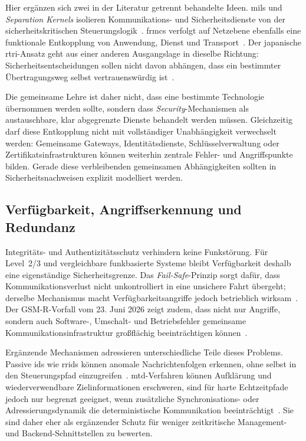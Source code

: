 \documentclass[runningheads]{res/llncs}
\begin{document}
Hier ergänzen sich zwei in der Literatur getrennt behandelte Ideen. \gls{mils} und \textit{Separation Kernels} isolieren Kommunikations- und Sicherheitsdienste von der sicherheitskritischen Steuerungslogik~\parencite[S. 31--35]{schulzIntegration2019}. \gls{frmcs} verfolgt auf Netzebene ebenfalls eine funktionale Entkopplung von Anwendung, Dienst und Transport~\parencite[S. 123, 211]{trinckaufETCS2024}. Der japanische \gls{rtri}-Ansatz geht aus einer anderen Ausgangslage in dieselbe Richtung: Sicherheitsentscheidungen sollen nicht davon abhängen, dass ein bestimmter Übertragungsweg selbst vertrauenswürdig ist~\parencite[S. 1--4]{iwamotoTrain2024}.

Die gemeinsame Lehre ist daher nicht, dass eine bestimmte Technologie übernommen werden sollte, sondern dass \textit{Security}-Mechanismen als austauschbare, klar abgegrenzte Dienste behandelt werden müssen. Gleichzeitig darf diese Entkopplung nicht mit vollständiger Unabhängigkeit verwechselt werden: Gemeinsame Gateways, Identitätsdienste, Schlüsselverwaltung oder Zertifikatsinfrastrukturen können weiterhin zentrale Fehler- und Angriffspunkte bilden. Gerade diese verbleibenden gemeinsamen Abhängigkeiten sollten in Sicherheitsnachweisen explizit modelliert werden.

\subsection{Verfügbarkeit, Angriffserkennung und Redundanz}
\label{sec:IDS_MTD_und_Redundanzkonzepte}
Integritäts- und Authentizitätsschutz verhindern keine Funkstörung. Für Level~2/3 und vergleichbare funkbasierte Systeme bleibt Verfügbarkeit deshalb eine eigenständige Sicherheitsgrenze. Das \textit{Fail-Safe}-Prinzip sorgt dafür, dass Kommunikationsverlust nicht unkontrolliert in eine unsichere Fahrt übergeht; derselbe Mechanismus macht Verfügbarkeitsangriffe jedoch betrieblich wirksam~\parencite[S. 56--59]{gaggeroSurvey2024}. Der GSM-R-Vorfall vom 23. Juni 2026 zeigt zudem, dass nicht nur Angriffe, sondern auch Software-, Umschalt- und Betriebsfehler gemeinsame Kommunikationsinfrastruktur großflächig beeinträchtigen können~\cite{dbinfragoUrsacheZugfunkStoerung2026}.

Ergänzende Mechanismen adressieren unterschiedliche Teile dieses Problems. Passive \gls{ids} wie \gls{rrids} können anomale Nachrichtenfolgen erkennen, ohne selbst in den Steuerungspfad einzugreifen~\parencite[S. 60--63]{melaragnoRail2016}. \gls{mtd}-Verfahren können Aufklärung und wiederverwendbare Zielinformationen erschweren, sind für harte Echtzeitpfade jedoch nur begrenzt geeignet, wenn zusätzliche Synchronisations- oder Adressierungsdynamik die deterministische Kommunikation beeinträchtigt~\parencite[S. 121]{poschingerOpenMTD2020}. Sie sind daher eher als ergänzender Schutz für weniger zeitkritische Management- und Backend-Schnittstellen zu bewerten.
\end{document}
